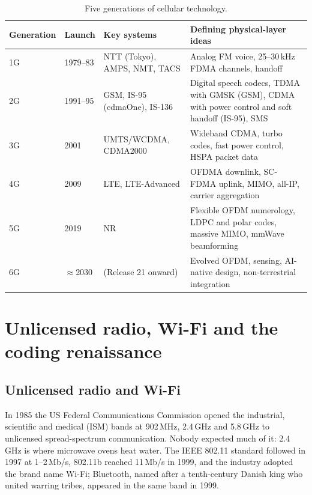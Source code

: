 \begin{table}[htbp]\centering\small
\caption{Five generations of cellular technology.}\label{tab:ch01:gens}
\begin{tabularx}{\linewidth}{@{}l l l X@{}}
\toprule
Generation & Launch & Key systems & Defining physical-layer ideas\\
\midrule
1G & 1979--83 & NTT (Tokyo), AMPS, NMT, TACS & Analog FM voice, 25--30\,kHz FDMA channels, handoff\\
2G & 1991--95 & GSM, IS-95 (cdmaOne), IS-136 & Digital speech codecs, TDMA with GMSK (GSM), CDMA with power control and soft handoff (IS-95), SMS\\
3G & 2001 & UMTS/WCDMA, CDMA2000 & Wideband CDMA, turbo codes, fast power control, HSPA packet data\\
4G & 2009 & LTE, LTE-Advanced & OFDMA downlink, SC-FDMA uplink, MIMO, all-IP, carrier aggregation\\
5G & 2019 & NR & Flexible OFDM numerology, LDPC and polar codes, massive MIMO, mmWave beamforming\\
6G & $\approx$2030 & (Release 21 onward) & Evolved OFDM, sensing, AI-native design, non-terrestrial integration\\
\bottomrule
\end{tabularx}
\end{table}



\chOneNeed
\section{Unlicensed radio, Wi-Fi and the coding renaissance}
\label{sec:ch01:modern}

\subsection{Unlicensed radio and Wi-Fi}

In 1985 the US Federal Communications Commission opened the industrial, scientific and medical (ISM)
bands at 902\,MHz, 2.4\,GHz and 5.8\,GHz to unlicensed spread-spectrum communication. Nobody expected
much of it: 2.4\,GHz is where microwave ovens heat water. The IEEE 802.11 standard followed in 1997 at
1--2\,Mb/s, 802.11b reached 11\,Mb/s in 1999, and the industry adopted the brand name Wi-Fi; Bluetooth,
named after a tenth-century Danish king who united warring tribes, appeared in the same band in 1999.

